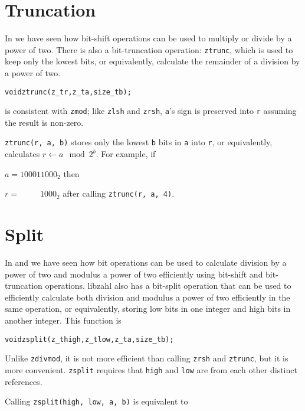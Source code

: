 \newpage
\section{Truncation}
\label{sec:Truncation}

In  we have seen how bit-shift
operations can be used to multiply or divide by a
power of two. There is also a bit-truncation
operation: {\tt ztrunc}, which is used to keep
only the lowest bits, or equivalently, calculate
the remainder of a division by a power of two.

\begin{alltt}
   void ztrunc(z_t r, z_t a, size_t b);
\end{alltt}

\noindent
is consistent with {\tt zmod}; like {\tt zlsh} and
{\tt zrsh}, {\tt a}'s sign is preserved into {\tt r}
assuming the result is non-zero.

{\tt ztrunc(r, a, b)} stores only the lowest {\tt b}
bits in {\tt a} into {\tt r}, or equivalently,
calculates $r \gets a \mod 2^b$. For example, if

$a = 100011000_2$ then

$r = \phantom{10001}1000_2$ after calling
{\tt ztrunc(r, a, 4)}.


\newpage
\section{Split}
\label{sec:Split}

In  and 
we have seen how bit operations can be used to
calculate division by a power of two and
modulus a power of two efficiently using
bit-shift and bit-truncation operations. libzahl
also has a bit-split operation that can be used
to efficiently calculate both division and
modulus a power of two efficiently in the same
operation, or equivalently, storing low bits
in one integer and high bits in another integer.
This function is

\begin{alltt}
   void zsplit(z_t high, z_t low, z_t a, size_t b);
\end{alltt}

\noindent
Unlike {\tt zdivmod}, it is not more efficient
than calling {\tt zrsh} and {\tt ztrunc}, but
it is more convenient. {\tt zsplit} requires
that {\tt high} and {\tt low} are from each
other distinct references.

Calling {\tt zsplit(high, low, a, b)} is
equivalent to

